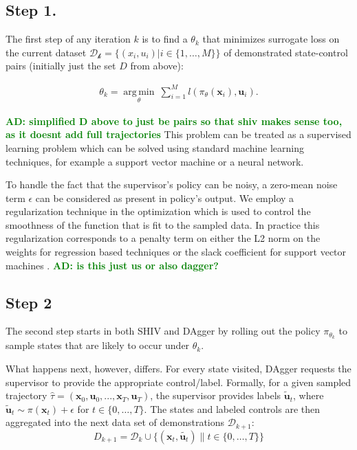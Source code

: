 \documentclass[10pt, conference]{ieeeconf}      %
\DeclareMathOperator*{\argmin}{arg\,min}
\newcommand{\bu}{\mathbf{u}}
\newcommand{\bx}{\mathbf{x}}
\newcommand{\adnote}[1]{\ifthenelse{\boolean{include-notes}}%
 {\textcolor{green}{\textbf{AD: #1}}}{}}
\newcommand{\fpnote}[1]{\ifthenelse{\boolean{include-notes}}%
 {\textcolor{blue}{\textbf{FP: #1}}}{}}
\begin{document}
\subsection{Step 1.}
The first step of any iteration $k$ is to find a $\theta_k$ that minimizes surrogate loss on the current dataset $\mathcal{D_k}=\{(x_i,u_i)|i\in\{1,\ldots,M\}\}$ of demonstrated state-control pairs (initially just the set $D$ from above):

 \vspace{-2ex}
\begin{align}\label{eq:super_objj}
\theta_{k} = \underset{\theta}{\argmin} \: \sum_{i=1}^{M} l(\pi_{\theta}(\bx_i),\bu_i).
\end{align}

\adnote{simplified D above to just be pairs so that shiv makes sense too, as it doesnt add full trajectories}
This problem can be treated as a supervised learning problem which can be solved using standard machine
learning techniques, for example a support vector machine or a neural network. 
 
To handle the fact that the supervisor's policy can be noisy, a zero-mean noise term $\epsilon$ 
can be considered as present in policy's output. We employ a regularization technique in the optimization which is
used to control the smoothness of the function that is fit to the sampled data. In practice this regularization corresponds to a penalty term on either the L2 norm on the weights for regression based techniques or the slack coefficient for support vector machines \cite{scholkopf2002learning}.\adnote{is this just us or also dagger?}
 
 \subsection{Step 2}
The second step starts in both SHIV and DAgger by rolling out the policy $\pi_{\theta_{k}}$ to sample states that are likely to occur under $\theta_{k}$. 

What happens next, however, differs. For every state visited, DAgger requests the supervisor to provide the appropriate control/label. Formally, for a given sampled trajectory  $\hat{\tau} = (\bx_0,\bu_0,...,\bx_T,\bu_T )$, the supervisor provides labels $\tilde{\bu}_t$, where $\tilde{\bu}_t \sim \pi(\bx_t) + \epsilon$ for $t\in \{0, \ldots, T\}$.
The states and labeled controls are then aggregated into the next data set of demonstrations $\mathcal{D}_{k+1}$:
$$D_{k+1}=\mathcal{D}_k \cup \{(\bx_t,\tilde{\bu_t})\|t\in\{0,\ldots,T\}\} $$
\end{document}
